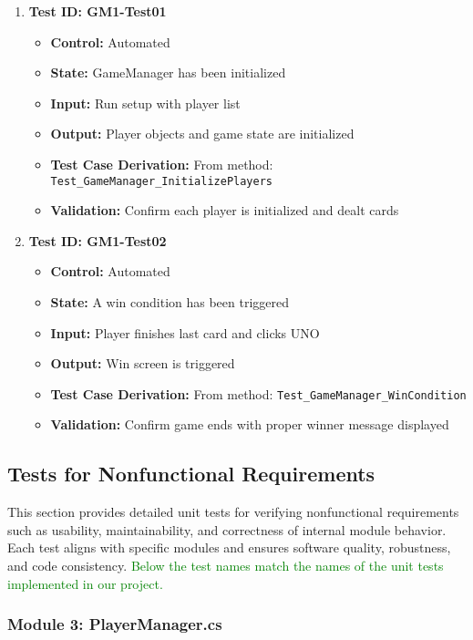 \documentclass[12pt]{article}
\newcommand{\added}[1]{\textcolor{green}{#1}}
\begin{document}
\begin{enumerate}
    \item \textbf{Test ID: GM1-Test01}
    \begin{itemize}
        \item \textbf{Control:} Automated
        \item \textbf{State:} GameManager has been initialized
        \item \textbf{Input:} Run setup with player list
        \item \textbf{Output:} Player objects and game state are initialized
        \item \textbf{Test Case Derivation:} From method: \texttt{Test\_GameManager\_InitializePlayers}
        \item \textbf{Validation:} Confirm each player is initialized and dealt cards
    \end{itemize}

    \item \textbf{Test ID: GM1-Test02}
    \begin{itemize}
        \item \textbf{Control:} Automated
        \item \textbf{State:} A win condition has been triggered
        \item \textbf{Input:} Player finishes last card and clicks UNO
        \item \textbf{Output:} Win screen is triggered
        \item \textbf{Test Case Derivation:} From method: \texttt{Test\_GameManager\_WinCondition}
        \item \textbf{Validation:} Confirm game ends with proper winner message displayed
    \end{itemize}
\end{enumerate}


\subsection{Tests for Nonfunctional Requirements}

This section provides detailed unit tests for verifying nonfunctional requirements such as usability, maintainability, and correctness of internal module behavior. Each test aligns with specific modules and ensures software quality, robustness, and code consistency. \added{Below the test names match the names of the unit tests implemented in our project.}

\subsubsection{Module 3: PlayerManager.cs}
\end{document}
